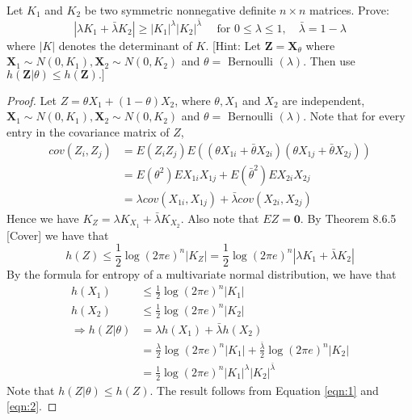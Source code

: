 \begin{exercise}{ Let $K_{1}$ and $K_{2}$ be two symmetric nonnegative definite $n \times n$ matrices. Prove:
  $$
  \left|\lambda K_{1}+\bar{\lambda} K_{2}\right| \geq\left|K_{1}\right|^{\lambda}\left|K_{2}\right|^{\bar{\lambda}} \quad \text { for } 0 \leq \lambda \leq 1, \quad \bar{\lambda}=1-\lambda
  $$
  where $|K|$ denotes the determinant of $K .$ [Hint: Let $\mathbf{Z}=\mathbf{X}_{\theta}$ where $\mathbf{X}_{1} \sim N\left(0, K_{1}\right), \mathbf{X}_{2} \sim N\left(0, K_{2}\right)$ and $\theta=$ Bernoulli $(\lambda) .$ Then
  use $h(\mathbf{Z} | \theta) \leq h(\mathbf{Z}) .]$}
  \begin{proof}
  Let $Z = \theta X_1 + (1 - \theta) X_2$, where $\theta,X_1$ and $X_2$ are independent, $\mathbf{X}_{1} \sim N\left(0, K_{1}\right), \mathbf{X}_{2} \sim N\left(0, K_{2}\right)$ and $\theta=$ Bernoulli $(\lambda) .$ Note that for every entry in the covariance matrix of $Z$,
  \begin{equation}
    \begin{aligned}
      cov(Z_i,Z_j) &= E(Z_i Z_j) E((\theta X_{1i} + \bar{\theta} X_{2i})(\theta X_{1j} + \bar{\theta} X_{2j})) \\
      &= E(\theta^2) E X_{1i} X_{1j} + E(\bar{\theta}^2) E X_{2i} X_{2j} \\
      &= \lambda cov(X_{1i},X_{1j}) + \bar{\lambda} cov (X_{2i},X_{2j})
    \end{aligned}
  \end{equation}
  Hence we have $K_Z = \lambda K_{X_1} + \bar{\lambda} K_{X_2}$. Also note that $EZ = \mathbf{0}$. By Theorem 8.6.5 [Cover] we have that 
  \begin{equation}
    h(Z) \le \frac{1}{2} \log (2\pi e)^n \left| K_Z \right| = \frac{1}{2} \log (2\pi e)^n \left|  \lambda K_{1} + \bar{\lambda} K_{2} \right|
    \label{eqn:1}
  \end{equation}
  By the formula for entropy of a multivariate normal distribution, we have that
  \begin{equation}
    \begin{aligned}
      h(X_1) &\le \frac{1}{2} \log (2\pi e)^n \left| K_1 \right| \\
      h(X_2) &\le \frac{1}{2} \log (2\pi e)^n \left| K_2 \right| \\
      \Rightarrow h(Z|\theta) &= \lambda h(X_1) + \bar{\lambda}h(X_2) \\
      &=  \frac{\lambda}{2} \log (2\pi e)^n \left| K_1 \right| + \frac{\bar{\lambda}}{2} \log (2\pi e)^n \left| K_2 \right| \\
      &= \frac{1}{2} \log (2\pi e)^n \left| K_{1} \right|^{\lambda} \left| K_{2} \right|^{\bar{\lambda}}
    \end{aligned}
    \label{eqn:2}
  \end{equation}
  Note that $h(Z|\theta) \le h(Z)$. The result follows from Equation \ref{eqn:1} and \ref{eqn:2}.
  \end{proof}
  \label{ex8-2}
\end{exercise}

